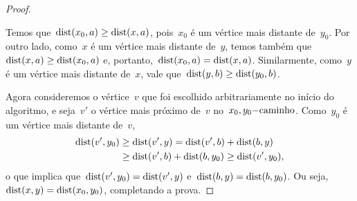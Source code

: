 \begin{proof}
			\begin{center}  \end{center}


			Temos que~${\mathrm{dist}(x_0,a)\ge \mathrm{dist}(x,a)}$,
			pois~$x_0$ é um vértice mais distante de~$y_0$.
			Por outro lado, como~$x$ é um vértice mais distante
			de~$y$, temos também que~${\mathrm{dist}(x,a)\ge \mathrm{dist}(x_0,a)}$
			e, portanto,~${\mathrm{dist}(x_0,a) =\mathrm{dist}(x,a)}$.
			Similarmente, como~$y$ é um vértice mais distante 
			de~$x$, vale que~${\mathrm{dist}(y,b) \ge \mathrm{dist}(y_0,b)}$.

			Agora consideremos o vértice~$v$ que foi escolhido 
			arbitrariamente no início do algoritmo, e seja~$v'$
			o vértice mais próximo de~$v$ no~$x_0,y_0\mathrm{-caminho}$.
			Como~$y_0$ é um vértice mais 
			distante de~$v$,
			\begin{align}
				\mathrm{dist}(v',y_0) &\ge \mathrm{dist}(v',y) =\mathrm{dist}(v',b) + 
				\mathrm{dist}(b,y)\nonumber \\
				&\ge \mathrm{dist}(v',b) + \mathrm{dist}(b,y_0) \ge \mathrm{dist}(v',y_0) 
				\nonumber,
			\end{align} 
			o que implica que~${\mathrm{dist}(v',y_0)=\mathrm{dist}(v',y)}$ 
			e~${\mathrm{dist}(b,y)=\mathrm{dist}(b,y_0)}$. 
			Ou seja,~${\mathrm{dist}(x,y) =\mathrm{dist}(x_0,y_0)}$,
			completando a prova.
	\end{proof}

	\bigskip
	\bigskip



